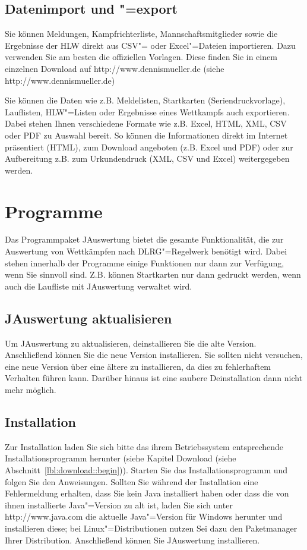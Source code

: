 \documentclass[11pt,a4paper,twoside,ngerman]{article}
\begin{document}
\subsection*{Datenimport und "=export}
Sie können Meldungen, Kampfrichterliste, Mannschaftsmitglieder sowie die Ergebnisse der HLW direkt aus CSV"= oder Excel"=Dateien importieren. Dazu verwenden Sie am besten die offiziellen Vorlagen. Diese finden Sie in einem einzelnen Download auf http://www.dennismueller.de (siehe http://www.dennismueller.de)

Sie können die Daten wie z.B. Meldelisten, Startkarten (Seriendruckvorlage), Lauflisten, HLW"=Listen oder Ergebnisse eines Wettkampfs auch exportieren. Dabei stehen Ihnen verschiedene Formate wie z.B. Excel, HTML, XML, CSV oder PDF zu Auswahl bereit. So können die Informationen direkt im Internet präsentiert (HTML), zum Download angeboten (z.B. Excel und PDF) oder zur Aufbereitung z.B. zum Urkundendruck (XML, CSV und Excel) weitergegeben werden.


\newpage

\section{Programme}
\label{lbl:paket::begin}
Das Programmpaket JAuswertung bietet die gesamte Funktionalität, die zur Auswertung von Wettkämpfen nach DLRG"=Regelwerk benötigt wird. Dabei stehen innerhalb der Programme einige Funktionen nur dann zur Verfügung, wenn Sie sinnvoll sind. Z.B. können Startkarten nur dann gedruckt werden, wenn auch die Laufliste mit JAuswertung verwaltet wird.


\subsection*{JAuswertung aktualisieren}
Um JAuswertung zu aktualisieren, deinstallieren Sie die alte Version. Anschließend können Sie die neue Version installieren. Sie sollten nicht versuchen, eine neue Version über eine ältere zu installieren, da dies zu fehlerhaftem Verhalten führen kann. Darüber hinaus ist eine saubere Deinstallation dann nicht mehr möglich.


\subsection*{Installation}
Zur Installation laden Sie sich bitte das ihrem Betriebssystem entsprechende Installationsprogramm herunter (siehe Kapitel Download (siehe Abschnitt~\ref{lbl:download::begin})). Starten Sie das Installationsprogramm und folgen Sie den Anweisungen. Sollten Sie während der Installation eine Fehlermeldung erhalten, dass Sie kein Java installiert haben oder dass die von ihnen installierte Java"=Version zu alt ist, laden Sie sich unter http://www.java.com die aktuelle Java"=Version für Windows herunter und installieren diese; bei Linux"=Distributionen nutzen Sei dazu den Paketmanager Ihrer Distribution. Anschließend können Sie JAuswertung installieren.
\end{document}
